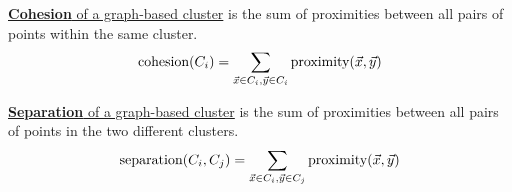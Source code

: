 \documentclass[11pt]{elegantbook}
\begin{document}
\underline{\textbf{Cohesion} of a graph-based cluster} is the sum of proximities between all pairs of points within the same cluster.
\begin{equation}
    \begin{aligned}
        \textnormal{cohesion}(C_i)=\sum_{\vec{x}\in C_i,\vec{y}\in C_i}\textnormal{proximity}(\vec{x},\vec{y})
    \end{aligned}
    \nonumber
\end{equation}

\underline{\textbf{Separation} of a graph-based cluster} is the sum of proximities between all pairs of points in the two different clusters.
\begin{equation}
    \begin{aligned}
        \textnormal{separation}(C_i,C_j)=\sum_{\vec{x}\in C_i,\vec{y}\in C_j}\textnormal{proximity}(\vec{x},\vec{y})
    \end{aligned}
    \nonumber
\end{equation}
\end{document}
